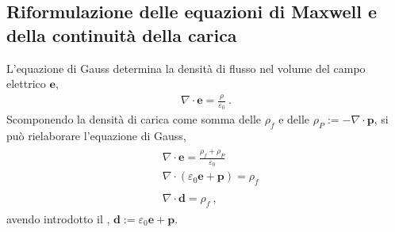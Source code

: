 \documentclass[letterpaper,10pt,italian]{jupyterBook}
\begin{document}
\subsection{Riformulazione delle equazioni di Maxwell e della continuità della carica}
\label{\detokenize{ch/media:riformulazione-delle-equazioni-di-maxwell-e-della-continuita-della-carica}}
\sphinxAtStartPar
L’equazione di Gauss determina la densità di flusso nel volume del campo elettrico \(\mathbf{e}\),
\begin{equation*}
\begin{split}\nabla \cdot \mathbf{e} = \frac{\rho}{\varepsilon_0} \ .\end{split}
\end{equation*}
\sphinxAtStartPar
Scomponendo la densità di carica come somma delle  \(\rho_f\) e delle  \(\rho_P := - \nabla \cdot \mathbf{p}\), si può rielaborare l’equazione di Gauss,
\begin{equation*}
\begin{split}\begin{aligned}
 & \nabla \cdot \mathbf{e} = \frac{\rho_f + \rho_P}{\varepsilon_0} \\
 & \nabla \cdot \left( \varepsilon_0 \mathbf{e} + \mathbf{p} \right) = \rho_f \\ \\
 & \nabla \cdot \mathbf{d} = \rho_f \ ,
\end{aligned}\end{split}
\end{equation*}
\sphinxAtStartPar
avendo introdotto il , \(\mathbf{d} := \varepsilon_0 \mathbf{e} + \mathbf{p}\).
\end{document}
